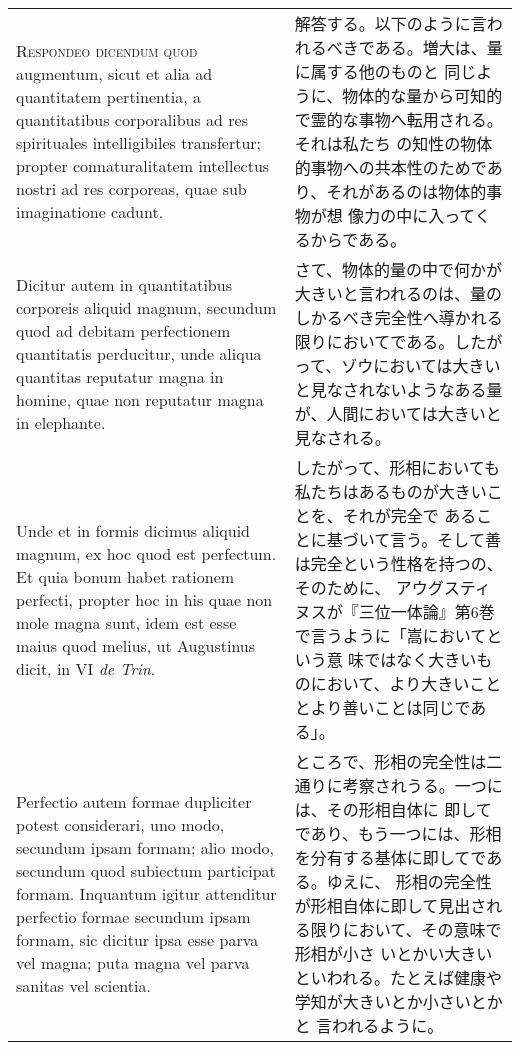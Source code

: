 \documentclass[10pt]{jsarticle} %
\begin{document}
\begin{longtable}{p{21em}p{21em}}
\\


{\scshape Respondeo dicendum quod} augmentum, sicut et alia ad quantitatem
pertinentia, a quantitatibus corporalibus ad res spirituales
intelligibiles transfertur; propter connaturalitatem intellectus
nostri ad res corporeas, quae sub imaginatione cadunt. 
&

解答する。以下のように言われるべきである。増大は、量に属する他のものと
同じように、物体的な量から可知的で霊的な事物へ転用される。それは私たち
の知性の物体的事物への共本性のためであり、それがあるのは物体的事物が想
像力の中に入ってくるからである。

\\


Dicitur autem
in quantitatibus corporeis aliquid magnum, secundum quod ad debitam
perfectionem quantitatis perducitur, unde aliqua quantitas reputatur
magna in homine, quae non reputatur magna in elephante. 

&

さて、物体的量の中で何かが大きいと言われるのは、量のしかるべき完全性へ導かれる限りにおいてである。したがって、ゾウにおいては大きいと見なされないようなある量が、人間においては大きいと見なされる。

\\


Unde et in
formis dicimus aliquid magnum, ex hoc quod est perfectum. Et quia
bonum habet rationem perfecti, propter hoc in his quae non mole magna
sunt, idem est esse maius quod melius, ut Augustinus dicit, in VI {\itshape de
Trin}. 


&

したがって、形相においても私たちはあるものが大きいことを、それが完全で
あることに基づいて言う。そして善は完全という性格を持つの、そのために、
アウグスティヌスが『三位一体論』第6巻で言うように「嵩においてという意
味ではなく大きいものにおいて、より大きいこととより善いことは同じであ
る」。

\\

Perfectio autem formae dupliciter potest considerari, uno modo,
secundum ipsam formam; alio modo, secundum quod subiectum participat
formam. 
Inquantum igitur attenditur perfectio formae secundum ipsam
formam, sic dicitur ipsa esse parva vel magna; puta magna vel parva
sanitas vel scientia. 


&

ところで、形相の完全性は二通りに考察されうる。一つには、その形相自体に
即してであり、もう一つには、形相を分有する基体に即してである。ゆえに、
 形相の完全性が形相自体に即して見出される限りにおいて、その意味で形相が小さ
 いとかい大きいといわれる。たとえば健康や学知が大きいとか小さいとかと
 言われるように。


\end{longtable}
\end{document}
